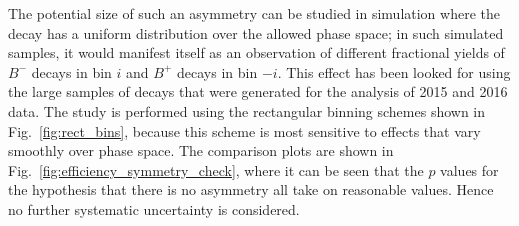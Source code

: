 The potential size of such an asymmetry can be studied in simulation where the \D decay has a uniform distribution over the allowed phase space; in such simulated samples, it would manifest itself as an observation of different fractional yields 
of $B^-$ decays in bin $i$ and $B^+$ decays in bin $-i$. This effect has been looked for using the large samples of \BtoDpi decays that were generated for the analysis of 2015 and 2016 data. The study is performed using the rectangular binning schemes shown in Fig.~\ref{fig:rect_bins}, because this scheme is most sensitive to effects that vary smoothly over phase space. The comparison plots are shown in Fig.~\ref{fig:efficiency_symmetry_check}, where it can be seen that the $p$ values for the hypothesis that there is no asymmetry all take on reasonable values. Hence no further systematic uncertainty is considered.

